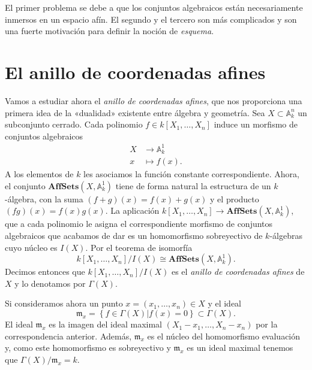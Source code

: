 \documentclass[12pt,a4paper]{article}
\theoremstyle{definition} \newtheorem{defn}[thm]{Definición}
\theoremstyle{definition} \newtheorem{ejemplo}[thm]{Ejemplo}
\theoremstyle{definition} \newtheorem{ejercicio}[thm]{Ejercicio}
\theoremstyle{remark} \newtheorem*{obs}{Observación}
\def\AA{\mathbb{A}}
\def\mm{\mathfrak{m}}
\begin{document}
El primer problema se debe a que los conjuntos algebraicos están necesariamente inmersos en un espacio afín. El segundo y el tercero son más complicados y son una fuerte motivación para definir la noción de \emph{esquema}.

  \section{El anillo de coordenadas afines}
   Vamos a estudiar ahora el \emph{anillo de coordenadas afines}, que nos proporciona una primera idea de la «dualidad» existente entre álgebra y geometría. Sea $X\subset \AA^n_k$ un subconjunto cerrado. Cada polinomio $f\in k[X_1,\dots,X_n]$ induce un morfismo de conjuntos algebraicos
  \begin{align*}
     X&\longrightarrow \AA^1_k\\ 
      x &\longmapsto f(x). 
    \end{align*} 
    A los elementos de $k$ les asociamos la función constante correspondiente. 
    Ahora, el conjunto $\mathbf{AffSets}(X,\AA^1_k)$ tiene de forma natural la estructura de un $k$-álgebra, con la suma $(f+g)(x)=f(x)+g(x)$ y el producto $(fg)(x)=f(x)g(x)$. La aplicación $k[X_1,\dots,X_n]\rightarrow \mathbf{AffSets}(X,\AA^1_k)$, que a cada polinomio le asigna el correspondiente morfismo de conjuntos algebraicos que acabamos de dar es un homomorfismo sobreyectivo de $k$-álgebras cuyo núcleo es $I(X)$. Por el teorema de isomorfía
    \begin{equation*}
      k[X_1,\dots,X_n]/I(X) \cong \mathbf{AffSets}(X,\AA^1_k).
    \end{equation*}
    Decimos entonces que $k[X_1,\dots,X_n]/I(X)$ es el \emph{anillo de coordenadas afines} de $X$ y lo denotamos por $\Gamma(X)$.
      
    Si consideramos ahora un punto $x=(x_1,\dots,x_n)\in X$ y el ideal
    \begin{equation*}
      \mm_x=\left\{ f\in \Gamma(X) | f(x)=0 \right\}\subset \Gamma(X).
    \end{equation*}
    El ideal $\mm_x$ es la imagen del ideal maximal $(X_1-x_1,\dots,X_n-x_n)$ por la correspondencia anterior. Además, $\mm_x$ es el núcleo del homomorfismo evaluación y, como este homomorfismo es sobreyectivo y $\mm_x$ es un ideal maximal tenemos que $\Gamma(X)/\mm_x=k$.
\end{document}
